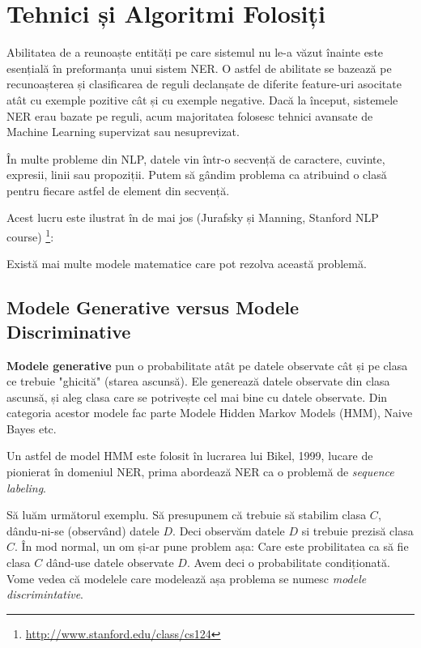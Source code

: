 \chapter{Tehnici și Algoritmi Folosiți}

Abilitatea de a reunoaște entități pe care sistemul nu le-a văzut înainte este esențială în preformanța unui sistem NER. O astfel de abilitate se bazează pe recunoașterea și clasificarea de reguli declanșate de diferite feature-uri asocitate atât cu exemple pozitive cât și cu exemple negative. Dacă la început, sistemele NER erau bazate pe reguli, acum majoritatea folosesc tehnici avansate de Machine Learning supervizat sau nesuprevizat. 

În multe probleme din NLP, datele vin într-o secvență de caractere, cuvinte, expresii, linii sau propoziții. Putem să gândim problema ca atribuind o clasă pentru fiecare astfel de element din secvență.

Acest lucru este ilustrat în  de mai jos (Jurafsky și Manning, Stanford NLP course) \footnote{\url{http://www.stanford.edu/class/cs124}}:


Există mai multe modele matematice care pot rezolva această problemă.

\section{Modele Generative versus Modele Discriminative}

\textbf{Modele generative} pun o probabilitate atât pe datele observate cât și pe clasa ce trebuie "ghicită" (starea ascunsă). Ele generează datele observate din clasa ascunsă, și aleg clasa care se potrivește cel mai bine cu datele observate. Din categoria acestor modele fac parte Modele Hidden Markov Models (HMM), Naive Bayes etc. 

Un astfel de model HMM este folosit în lucrarea lui Bikel, 1999, lucare de pionierat în domeniul NER, prima abordează NER ca o problemă de \textit{sequence labeling}.\cite{Bikel99analgorithm}

Să luăm următorul exemplu. Să presupunem că trebuie să stabilim clasa $C$, dându-ni-se (observând) datele $D$. Deci observăm datele $D$ si trebuie prezisă clasa $C$. În mod normal, un om și-ar pune problem așa: Care este probilitatea ca să fie clasa $C$ dând-use datele observate $D$. Avem deci o probabilitate condiționată. Vome vedea că modelele care modelează așa problema se numesc \textit{modele discrimintative}.

